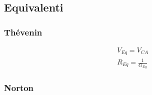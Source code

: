 \documentclass[10pt]{article}
\begin{document}
    \begin{minipage}[t]{.7\textwidth}
        
        \subsection*{Equivalenti}

            \begin{minipage}[t]{.5\textwidth}
                \vspace{-\baselineskip}
                
                \subsubsection*{Thévenin}

                    \begin{minipage}[t]{.3\textwidth}
                        \vspace{-\baselineskip}

                        

                    \end{minipage}
                    \hfill
                    \begin{minipage}[t]{.7\textwidth}

                        \begin{align*}
                            &V_{Eq} = V_{CA}\\
                            &R_{Eq} = \frac{1}{G_{Eq}}
                        \end{align*}

                    \end{minipage}

            \end{minipage}
            \hfill
            \begin{minipage}[t]{.5\textwidth}
                \vspace{-\baselineskip}
                
                \subsubsection*{Norton}

                    \begin{minipage}[t]{.3\textwidth}
                        \vspace{-\baselineskip}


\end{minipage}
\end{minipage}
\end{minipage}
\end{document}
